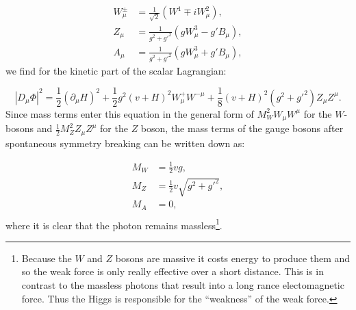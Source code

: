 \begin{equation}
\begin{split}
W^\pm_\mu &= \frac{1}{\sqrt{2}}\left(W^1 \mp iW^2_\mu\right),\\
Z_\mu &= \frac{1}{g^2 + g'^2}\left(gW^3_\mu - g'B_\mu\right),\\
A_\mu &= \frac{1}{g^2 + g'^2}\left(gW^3_\mu + g'B_\mu\right),
\end{split}
\end{equation}
we find for the kinetic part of the scalar Lagrangian:

\begin{equation}
|D_\mu\Phi|^2 = \frac{1}{2} \left(\partial_\mu H\right)^2 + \frac{1}{2}g^2\left(v+H\right)^2W^+_\mu W^{-\mu} + \frac{1}{8}\left(v+H\right)^2 \left(g^2 + g'^2\right)Z_\mu Z^\mu.
\end{equation}
Since mass terms enter this equation in the general form of $M^2_W W_\mu W^\mu$ for the $W$-bosons and $\frac{1}{2}M_Z^2 Z_\mu Z^\mu$ for the $Z$ boson, the mass terms of the gauge bosons after spontaneous symmetry breaking can be written down as:

\begin{equation}
\label{eq:massesHiggs}
\begin{split}
M_W &= \frac{1}{2}vg,\\
M_Z &= \frac{1}{2}v\sqrt{g^2+g'^2},\\
M_A &= 0,\\
\end{split}
\end{equation}
where it is clear that the photon remains massless\footnote{Because the $W$ and $Z$ bosons are massive it costs energy to produce them and so the weak force is only really effective over a short distance. This is in contrast to the massless photons that result into a long rance electomagnetic force. Thus the Higgs is responsible for the “weakness” of the weak force.}.


